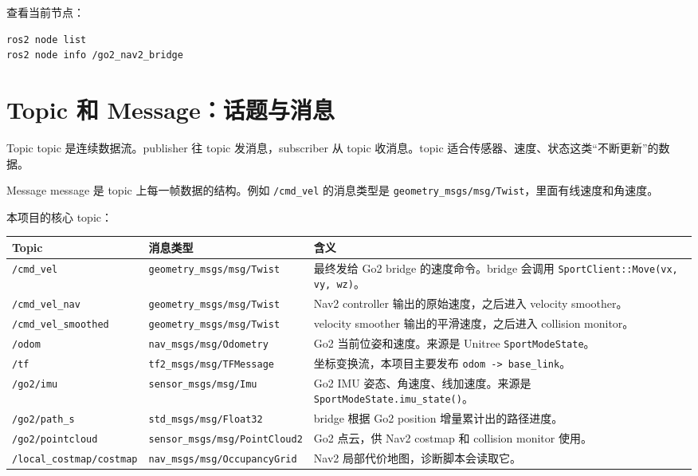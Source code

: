 \documentclass[UTF8,11pt,a4paper,openany]{ctexrep}
\newcommand{\code}[1]{\nolinkurl{#1}}
\newcommand{\topic}[1]{\nolinkurl{#1}}
\newcommand{\msg}[1]{\nolinkurl{#1}}
\begin{document}
查看当前节点：

\begin{lstlisting}[language=bash]
ros2 node list
ros2 node info /go2_nav2_bridge
\end{lstlisting}

\section{Topic 和 Message：话题与消息}

\begin{termdef}{Topic}
topic 是连续数据流。publisher 往 topic 发消息，subscriber 从 topic 收消息。topic 适合传感器、速度、状态这类“不断更新”的数据。
\end{termdef}

\begin{termdef}{Message}
message 是 topic 上每一帧数据的结构。例如 \topic{/cmd_vel} 的消息类型是 \msg{geometry_msgs/msg/Twist}，里面有线速度和角速度。
\end{termdef}

本项目的核心 topic：

\begin{longtable}{L{0.22\textwidth} L{0.28\textwidth} L{0.40\textwidth}}
\toprule
\textbf{Topic} & \textbf{消息类型} & \textbf{含义} \\
\midrule
\endhead
\topic{/cmd_vel} & \msg{geometry_msgs/msg/Twist} & 最终发给 Go2 bridge 的速度命令。bridge 会调用 \code{SportClient::Move(vx, vy, wz)}。\\
\topic{/cmd_vel_nav} & \msg{geometry_msgs/msg/Twist} & Nav2 controller 输出的原始速度，之后进入 velocity smoother。\\
\topic{/cmd_vel_smoothed} & \msg{geometry_msgs/msg/Twist} & velocity smoother 输出的平滑速度，之后进入 collision monitor。\\
\topic{/odom} & \msg{nav_msgs/msg/Odometry} & Go2 当前位姿和速度。来源是 Unitree \code{SportModeState}。\\
\topic{/tf} & \msg{tf2_msgs/msg/TFMessage} & 坐标变换流，本项目主要发布 \code{odom -> base_link}。\\
\topic{/go2/imu} & \msg{sensor_msgs/msg/Imu} & Go2 IMU 姿态、角速度、线加速度。来源是 \code{SportModeState.imu_state()}。\\
\topic{/go2/path_s} & \msg{std_msgs/msg/Float32} & bridge 根据 Go2 position 增量累计出的路径进度。\\
\topic{/go2/pointcloud} & \msg{sensor_msgs/msg/PointCloud2} & Go2 点云，供 Nav2 costmap 和 collision monitor 使用。\\
\topic{/local_costmap/costmap} & \msg{nav_msgs/msg/OccupancyGrid} & Nav2 局部代价地图，诊断脚本会读取它。\\
\bottomrule
\end{longtable}
\end{document}
